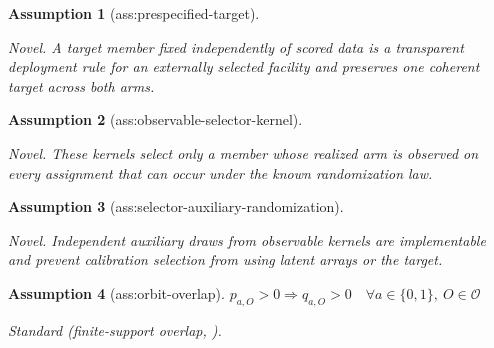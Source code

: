 \documentclass{article}
\newtheorem{assumption}{Assumption}
\begin{document}
\begin{assumption}[ass:prespecified-target]\label{ass:prespecified-target}
\par\noindent {}\par\noindent
\par\smallskip\noindent\emph{Novel.} A target member fixed independently of scored data is a transparent deployment rule for an externally selected facility and preserves one coherent target across both arms.
\end{assumption}

\begin{assumption}[ass:observable-selector-kernel]\label{ass:observable-selector-kernel}
\par\noindent {}\par\noindent
\par\smallskip\noindent\emph{Novel.} These kernels select only a member whose realized arm is observed on every assignment that can occur under the known randomization law.
\end{assumption}

\begin{assumption}[ass:selector-auxiliary-randomization]\label{ass:selector-auxiliary-randomization}
\par\noindent {}\par\noindent
\par\smallskip\noindent\emph{Novel.} Independent auxiliary draws from observable kernels are implementable and prevent calibration selection from using latent arrays or the target.
\end{assumption}

\begin{assumption}[ass:orbit-overlap]\label{ass:orbit-overlap}
\(p_{a,O}>0\Rightarrow q_{a,O}>0\quad\forall a\in\{0,1\},\ O\in\mathcal O\)
\par\smallskip\noindent\emph{Standard} (finite-support overlap, \cite{TibshiraniBarberCandesRamdas2019}).
\end{assumption}
\end{document}
